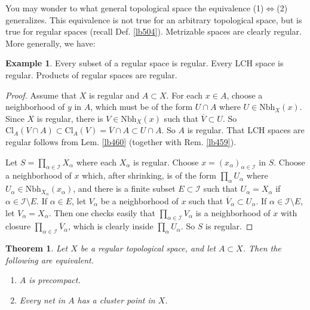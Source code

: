\documentclass[12pt,b5paper,notitlepage]{article}
\theoremstyle{definition}
\newtheorem{eg}[df]{Example}
\theoremstyle{plain}
\newtheorem{thm}[df]{Theorem}
\newcommand{\ovl}{\overline}
\newcommand{\scr}{\mathscr}
\newcommand{\Nbh}{\mathrm{Nbh}}
\newcommand{\Cl}{\mathrm{Cl}}
\numberwithin{equation}{section}
\begin{document}
You may wonder to what general topological space the equivalence (1)$\Leftrightarrow$(2) generalizes. This equivalence is not true for an arbitrary topological space, but is true for regular spaces (recall Def. \ref{lb504}). Metrizable spaces are clearly regular. More generally, we have:

\begin{eg}\label{lb506}
Every subset of a regular space is regular. Every LCH space is regular. Products of regular spaces are regular.
\end{eg}

\begin{proof}%
Assume that $X$ is regular and $A\subset X$. For each $x\in A$, choose a neighborhood of $y$ in $A$, which must be of the form $U\cap A$ where $U\in\Nbh_X(x)$. Since $X$ is regular, there is $V\in\Nbh_X(x)$ such that $\ovl V\subset U$. So $\Cl_A(V\cap A)\subset \Cl_A(V)=\ovl V\cap A\subset U\cap A$. So $A$ is regular. That LCH spaces are regular follows from Lem. \ref{lb460} (together with Rem. \ref{lb459}).

Let $S=\prod_{\alpha\in\scr I}X_\alpha$ where each $X_\alpha$ is regular. Choose $x=(x_\alpha)_{\alpha\in\scr I}$ in $S$. Choose a neighborhood of $x$ which, after shrinking, is of the form $\prod_\alpha U_\alpha$ where $U_\alpha\in\Nbh_{X_\alpha}(x_\alpha)$, and there is a finite subset $E\subset\scr I$ such that $U_\alpha=X_\alpha$ if $\alpha\in\scr I\setminus E$. If $\alpha\in E$, let $V_\alpha$ be a neighborhood of $x$ such that $\ovl V_\alpha\subset U_\alpha$. If $\alpha\in\scr I\setminus E$, let $V_\alpha=X_\alpha$. Then one checks easily that $\prod_{\alpha\in\scr I} V_\alpha$ is a neighborhood of $x$ with closure $\prod_{\alpha\in\scr I} \ovl V_\alpha$, which is clearly inside $\prod_\alpha U_\alpha$. So $S$ is regular.
\end{proof}


\begin{thm}\label{lb507}
Let $X$ be a regular topological space, and let $A\subset X$. Then the following are equivalent.
\begin{enumerate}[label=(\arabic*)]
\item $A$ is precompact.
\item Every net in $A$ has a cluster point in $X$.
\end{enumerate}
\end{thm}
\end{document}
